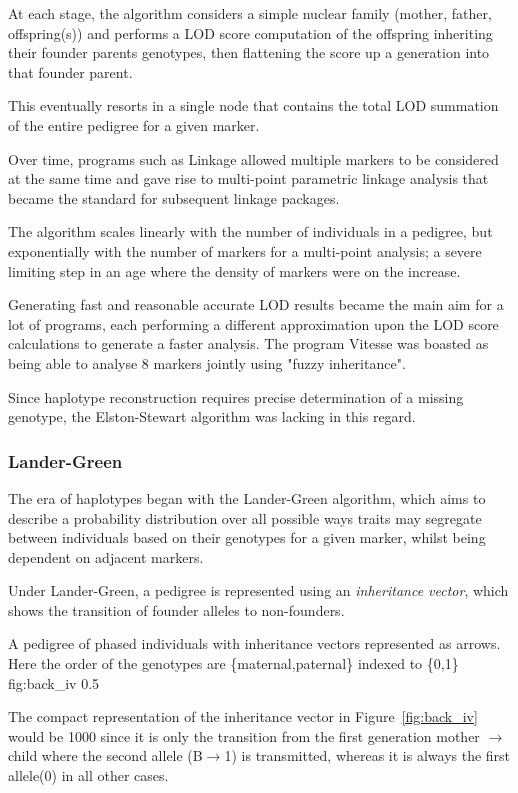At each stage, the algorithm considers a simple nuclear family (mother, father, offspring(s)) and performs a LOD score computation of the offspring inheriting their founder parents genotypes, then flattening the score up a generation into that founder parent.

This eventually resorts in a single node that contains the total LOD summation of the entire pedigree for a given marker.

Over time, programs such as \gls{Linkage} allowed multiple markers to be considered at the same time and gave rise to \gls{multi-point parametric} linkage analysis that became the standard for subsequent linkage packages.

The algorithm scales linearly with the number of individuals in a pedigree, but exponentially with the number of markers for a multi-point analysis; a severe limiting step in an age where the density of markers were on the increase.

Generating fast and reasonable accurate LOD results became the main aim for a lot of programs, each performing a different approximation upon the LOD score calculations to generate a faster analysis. The program \gls{Vitesse} was boasted as being able to analyse 8 markers jointly using "fuzzy inheritance".

Since haplotype reconstruction requires precise determination of a missing genotype, the Elston-Stewart algorithm was lacking in this regard.

\subsubsection{Lander-Green}

The era of haplotypes began with the Lander-Green algorithm, which aims to describe a probability distribution over all possible ways traits may segregate between individuals based on their genotypes for a given marker, whilst being dependent on adjacent markers.

Under Lander-Green, a pedigree is represented using an \textit{inheritance vector}, which shows the transition of founder alleles to non-founders.

	{A pedigree of phased individuals with inheritance vectors represented as arrows. Here the order of the genotypes are \{maternal,paternal\} indexed to \{0,1\}}
	{fig:back_iv}
	{0.5}


The compact representation of the inheritance vector in Figure~\ref{fig:back_iv} would be 1000 since it is only the transition from the first generation mother \(\rightarrow\) child where the second allele (B\(\rightarrow\)1) is transmitted, whereas it is always the first allele(0) in all other cases.

